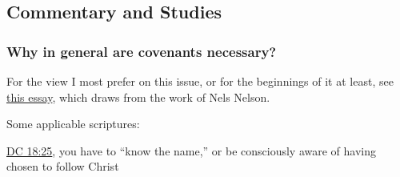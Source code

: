 	
	
	
\subsection{Commentary and Studies} %
	\label{COVENANT-COMMENTARY}

	
		
	\subsubsection{Why in general are covenants necessary?}
		\label{COVENANT-necessity}
		
		For the view I most prefer on this issue, or for the beginnings of it at least, see \href{https://climbingtherainbows.substack.com/p/naughty-nellys-home-4-teh-holidayz-tour-2024-nels-nelson-on-covenants}{this essay}, which draws from the work of Nels Nelson.
		
		Some applicable scriptures:
		
		\begin{compactitem}
			\item \hyperref[DC18-25]{DC 18:25}, you have to ``know the name,'' or be consciously aware of having chosen to follow Christ
		\end{compactitem}
		
